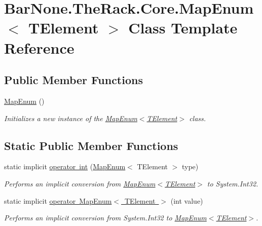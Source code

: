 \hypertarget{class_bar_none_1_1_the_rack_1_1_core_1_1_map_enum}{}\section{Bar\+None.\+The\+Rack.\+Core.\+Map\+Enum$<$ T\+Element $>$ Class Template Reference}
\label{class_bar_none_1_1_the_rack_1_1_core_1_1_map_enum}


 


\subsection*{Public Member Functions}
\begin{DoxyCompactItemize}
\item 
\mbox{\hyperlink{class_bar_none_1_1_the_rack_1_1_core_1_1_map_enum_ae558c9ed80801b7e8180f3fc48e31e1e}{Map\+Enum}} ()
\begin{DoxyCompactList}\small\item\em Initializes a new instance of the \mbox{\hyperlink{class_bar_none_1_1_the_rack_1_1_core_1_1_map_enum_ae558c9ed80801b7e8180f3fc48e31e1e}{Map\+Enum$<$\+T\+Element$>$}} class. \end{DoxyCompactList}\end{DoxyCompactItemize}
\subsection*{Static Public Member Functions}
\begin{DoxyCompactItemize}
\item 
static implicit \mbox{\hyperlink{class_bar_none_1_1_the_rack_1_1_core_1_1_map_enum_aaf9c580ee21823b9aaa68af3b907b395}{operator int}} (\mbox{\hyperlink{class_bar_none_1_1_the_rack_1_1_core_1_1_map_enum}{Map\+Enum}}$<$ T\+Element $>$ type)
\begin{DoxyCompactList}\small\item\em Performs an implicit conversion from \mbox{\hyperlink{class_bar_none_1_1_the_rack_1_1_core_1_1_map_enum_ae558c9ed80801b7e8180f3fc48e31e1e}{Map\+Enum$<$\+T\+Element$>$}} to System.\+Int32. \end{DoxyCompactList}\item 
static implicit \mbox{\hyperlink{class_bar_none_1_1_the_rack_1_1_core_1_1_map_enum_ad337f5c17319404e8bfaef248c63ecf1}{operator Map\+Enum$<$ T\+Element $>$}} (int value)
\begin{DoxyCompactList}\small\item\em Performs an implicit conversion from System.\+Int32 to \mbox{\hyperlink{class_bar_none_1_1_the_rack_1_1_core_1_1_map_enum_ae558c9ed80801b7e8180f3fc48e31e1e}{Map\+Enum$<$\+T\+Element$>$}}. \end{DoxyCompactList}\end{DoxyCompactItemize}
